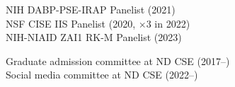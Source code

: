 \documentclass[10pt]{article}
\newenvironment{myindentpar}[1]%
{\begin{list}{}%
         {\setlength{\leftmargin}{#1}}%
         \item[]%
}
{\end{list}}
\newcounter{list}
\begin{document}
\begin{myindentpar}{0.75cm}

\hspace{-0.75cm}{\bf Governmental Service}

{\small
\textcolor{white}{} NIH DABP-PSE-IRAP Panelist (2021) \\
\textcolor{white}{} NSF CISE IIS Panelist (2020, $\times 3$ in 2022) \\
\textcolor{white}{} NIH-NIAID ZAI1 RK-M Panelist (2023)
}

\hspace{-0.75cm}{\bf Departmental Service}

{\small

\textcolor{white}{} Graduate admission committee at ND CSE (2017--) \\
\textcolor{white}{} Social media committee at ND CSE (2022--)
}

\hspace{-0.75cm}{\bf Ph.D. Dissertation Committee}

{\small

}
\end{myindentpar}
\end{document}
